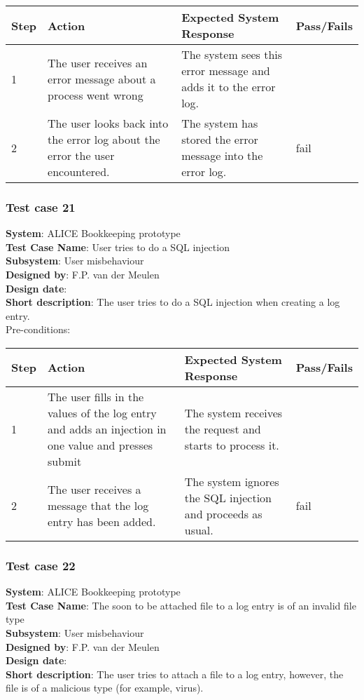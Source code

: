 \begin{longtable}{ | p{0.8cm} | p{4.5cm} | p{6cm} | p{1.5cm} |}
\hline
Step & Action & Expected System Response & Pass/Fails  \\ \hline
1 & The user receives an error message about a process went wrong & The system sees this error message and adds it to the error log. &  \\ \hline
2 & The user looks back into the error log about the error the user encountered. & The system has stored the error message into the error log. & fail\\ \hline
 
\end{longtable}

\subsubsection{Test case 21}
\textbf{System}:  ALICE Bookkeeping prototype \\
\textbf{Test Case Name}:  User tries to do a SQL injection  \\
\textbf{Subsystem}:  User misbehaviour \\
\textbf{Designed by}:  F.P. van der Meulen\\
\textbf{Design date}:  \\
\textbf{Short description}: The user tries to do a SQL injection when creating a log entry. \\

Pre-conditions: \\

\begin{longtable}{ | p{0.8cm} | p{4.5cm} | p{6cm} | p{1.5cm} |}
\hline
Step & Action & Expected System Response & Pass/Fails  \\ \hline
1 & The user fills in the values of the log entry and adds an injection in one value and presses submit & The system receives the request and starts to process it. &  \\ \hline
2 & The user receives a message that the log entry has been added. & The system ignores the SQL injection and proceeds as usual. & fail\\ \hline
 
\end{longtable}

\subsubsection{Test case 22}
\textbf{System}:  ALICE Bookkeeping prototype \\
\textbf{Test Case Name}:  The soon to be attached file to a log entry is of an invalid file type  \\
\textbf{Subsystem}:  User misbehaviour \\
\textbf{Designed by}:  F.P. van der Meulen\\
\textbf{Design date}:  \\
\textbf{Short description}: The user tries to attach a file to a log entry, however, the file is of a malicious type (for example, virus). \\

